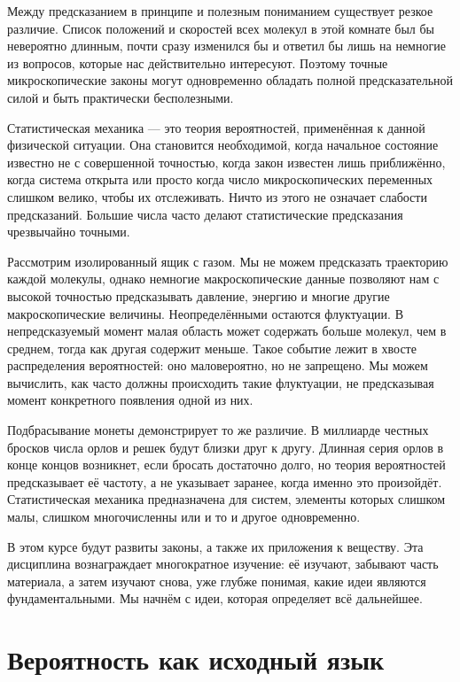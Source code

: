 Между предсказанием в принципе и полезным пониманием существует резкое различие. Список положений и скоростей всех молекул в этой комнате был бы невероятно длинным, почти сразу изменился бы и ответил бы лишь на немногие из вопросов, которые нас действительно интересуют. Поэтому точные микроскопические законы могут одновременно обладать полной предсказательной силой и быть практически бесполезными.

Статистическая механика — это теория вероятностей, применённая к данной физической ситуации. Она становится необходимой, когда начальное состояние известно не с совершенной точностью, когда закон известен лишь приближённо, когда система открыта или просто когда число микроскопических переменных слишком велико, чтобы их отслеживать. Ничто из этого не означает слабости предсказаний. Большие числа часто делают статистические предсказания чрезвычайно точными.

Рассмотрим изолированный ящик с газом. Мы не можем предсказать траекторию каждой молекулы, однако немногие макроскопические данные позволяют нам с высокой точностью предсказывать давление, энергию и многие другие макроскопические величины. Неопределёнными остаются флуктуации. В непредсказуемый момент малая область может содержать больше молекул, чем в среднем, тогда как другая содержит меньше. Такое событие лежит в хвосте распределения вероятностей: оно маловероятно, но не запрещено. Мы можем вычислить, как часто должны происходить такие флуктуации, не предсказывая момент конкретного появления одной из них.

Подбрасывание монеты демонстрирует то же различие. В миллиарде честных бросков числа орлов и решек будут близки друг к другу. Длинная серия орлов в конце концов возникнет, если бросать достаточно долго, но теория вероятностей предсказывает её частоту, а не указывает заранее, когда именно это произойдёт. Статистическая механика предназначена для систем, элементы которых слишком малы, слишком многочисленны или и то и другое одновременно.

В этом курсе будут развиты законы, а также их приложения к веществу. Эта дисциплина вознаграждает многократное изучение: её изучают, забывают часть материала, а затем изучают снова, уже глубже понимая, какие идеи являются фундаментальными. Мы начнём с идеи, которая определяет всё дальнейшее.

\section{Вероятность как исходный язык}

